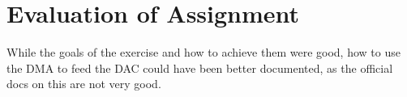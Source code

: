 \section{Evaluation of Assignment}
While the goals of the exercise and how to achieve them were good, how to use the DMA to feed the DAC could have been better documented, as the official docs on this are not very good.

